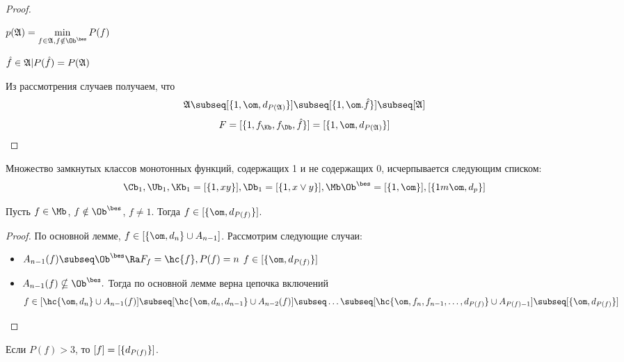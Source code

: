 \documentclass[unicode, 10pt, a4paper, oneside, fleqn]{article}
\begin{document}
\begin{proof}
\begin{enumerate}
\begin{df}
\begin{math}
       p(\ag)=\min\limits_{f\in\ag,f\notin\Oib}P(f)
     \end{math}
   \end{df}
   \begin{denote}
     \begin{math}
       \hat{f}\in\mathfrak{A}|P(\hat{f})=P(\mathfrak{A})
     \end{math}
   \end{denote}
\end{enumerate}
Из рассмотрения случаев получаем, что
\begin{displaymath}
\ag\subseq\cls{1,\om,d_{P(\ag)}}\subseq\cls{1,\om.\hat{f}}\subseq[\ag]
\end{displaymath}
\begin{displaymath}
        F=\cls{1,\fK,\fD,\hat{f}}=\cls{1,\om, d_{P(\ag)}}
\end{displaymath}
\end{proof}
\begin{imp}
  Множество замкнутых классов монотонных функций, содержащих 1 и не содержащих
  0, исчерпывается следующим списком:
  \begin{displaymath}
    \Cb_1,\Ub_1,\Kb_1=\cls{1,xy},\Db_1=\cls{1,\dn}, \Mb\Oib=\cls{1,\om},\cls{1m\om, d_p}
  \end{displaymath}
\end{imp}
\begin{lemma}
  Пусть $f\in\Mb$, $f\notin\Oib$, $f\neq 1$. Тогда $f\in\cls{\om,d_{P(f)}}$. 
\end{lemma}
\begin{proof}
    По основной лемме, $f\in[\{\om,d_n\}\cup A_{n-1}]$. 
    Рассмотрим следующие случаи:
    \begin{itemize}
        \item 
          \begin{math}
            A_{n-1}(f)\subseq\Oib \Ra F_f=\hc{f}, P(f)=n
          \end{math}
          \WHY
          \begin{math}
            f\in\cls{\om,d_{P(f)}}
          \end{math}
        \item
          \begin{math}
            A_{n-1}(f) \nsubseq\Oib.
          \end{math}
          Тогда по основной лемме верна цепочка включений
          \begin{displaymath}
            f\in[\hc{\om,d_n}\cup A_{n-1}(f)]\subseq[\hc{\om,d_n,d_{n-1}}\cup A_{n-2}(f)]\subseq\ldots
            \subseq[\hc{\om,f_n,f_{n-1},\ldots,d_{P(f)}}\cup A_{P(f)-1}]\subseq\cls{\om,d_{P(f)}}
          \end{displaymath}
    \end{itemize}
\end{proof}
\begin{imp}
  Если $P(f)>3$, то $[f] = [\{d_{P(f)}\}]$.
\end{imp}
\end{document}
